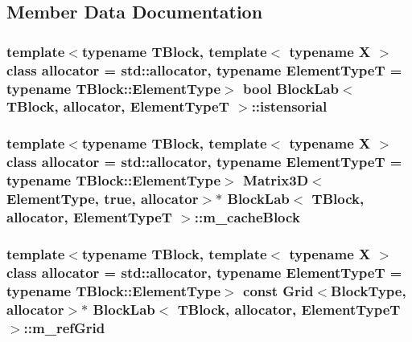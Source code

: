 \subsection{Member Data Documentation}
\hypertarget{class_block_lab_ade306bb6935a0ead765444534c2e05db}{}
\subsubsection[{istensorial}]{\setlength{\rightskip}{0pt plus 5cm}template$<$typename T\+Block, template$<$ typename X $>$ class allocator = std\+::allocator, typename Element\+Type\+T = typename T\+Block\+::\+Element\+Type$>$ bool {\bf Block\+Lab}$<$ T\+Block, allocator, Element\+Type\+T $>$\+::istensorial\hspace{0.3cm}{\ttfamily [protected]}}\label{class_block_lab_ade306bb6935a0ead765444534c2e05db}
\hypertarget{class_block_lab_aa6a4c4e00a9bb5ca5780d820b146485b}{}
\subsubsection[{m\+\_\+cache\+Block}]{\setlength{\rightskip}{0pt plus 5cm}template$<$typename T\+Block, template$<$ typename X $>$ class allocator = std\+::allocator, typename Element\+Type\+T = typename T\+Block\+::\+Element\+Type$>$ {\bf Matrix3\+D}$<${\bf Element\+Type}, true, allocator$>$$\ast$ {\bf Block\+Lab}$<$ T\+Block, allocator, Element\+Type\+T $>$\+::m\+\_\+cache\+Block\hspace{0.3cm}{\ttfamily [protected]}}\label{class_block_lab_aa6a4c4e00a9bb5ca5780d820b146485b}
\hypertarget{class_block_lab_acccfe85f166f20526118fce09b28fb04}{}
\subsubsection[{m\+\_\+ref\+Grid}]{\setlength{\rightskip}{0pt plus 5cm}template$<$typename T\+Block, template$<$ typename X $>$ class allocator = std\+::allocator, typename Element\+Type\+T = typename T\+Block\+::\+Element\+Type$>$ const {\bf Grid}$<${\bf Block\+Type}, allocator$>$$\ast$ {\bf Block\+Lab}$<$ T\+Block, allocator, Element\+Type\+T $>$\+::m\+\_\+ref\+Grid\hspace{0.3cm}{\ttfamily [protected]}}\label{class_block_lab_acccfe85f166f20526118fce09b28fb04}
\hypertarget{class_block_lab_a0e11603d73ab4923e1d9033edccdb572}{}
